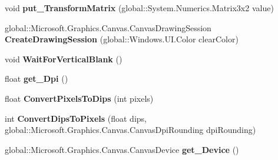 \begin{DoxyCompactItemize}
\item 
\mbox{\label{class_microsoft_1_1_graphics_1_1_canvas_1_1_canvas_swap_chain_ad28f820299100bac196380421a7a0b85}} 
void {\bfseries put\+\_\+\+Transform\+Matrix} (global\+::\+System.\+Numerics.\+Matrix3x2 value)
\item 
\mbox{\label{class_microsoft_1_1_graphics_1_1_canvas_1_1_canvas_swap_chain_aa66e0d5dceb643547c2d3c4cd32524d5}} 
global\+::\+Microsoft.\+Graphics.\+Canvas.\+Canvas\+Drawing\+Session {\bfseries Create\+Drawing\+Session} (global\+::\+Windows.\+U\+I.\+Color clear\+Color)
\item 
\mbox{\label{class_microsoft_1_1_graphics_1_1_canvas_1_1_canvas_swap_chain_a61aee63789e72938059605776f93e0cb}} 
void {\bfseries Wait\+For\+Vertical\+Blank} ()
\item 
\mbox{\label{class_microsoft_1_1_graphics_1_1_canvas_1_1_canvas_swap_chain_a57b260bc4cfac4ae4de27a622597842d}} 
float {\bfseries get\+\_\+\+Dpi} ()
\item 
\mbox{\label{class_microsoft_1_1_graphics_1_1_canvas_1_1_canvas_swap_chain_ae9f72e86c9c20acc20c87071b984edf3}} 
float {\bfseries Convert\+Pixels\+To\+Dips} (int pixels)
\item 
\mbox{\label{class_microsoft_1_1_graphics_1_1_canvas_1_1_canvas_swap_chain_ac11cc05881238dae1f5c353c24222685}} 
int {\bfseries Convert\+Dips\+To\+Pixels} (float dips, global\+::\+Microsoft.\+Graphics.\+Canvas.\+Canvas\+Dpi\+Rounding dpi\+Rounding)
\item 
\mbox{\label{class_microsoft_1_1_graphics_1_1_canvas_1_1_canvas_swap_chain_a728f12738ca799060ecafc7879c8dd58}} 
global\+::\+Microsoft.\+Graphics.\+Canvas.\+Canvas\+Device {\bfseries get\+\_\+\+Device} ()
\item 
\mbox{\label{class_microsoft_1_1_graphics_1_1_canvas_1_1_canvas_swap_chain_aad6c8f27597930094a373c7767649cc4}} 

\end{DoxyCompactItemize}
